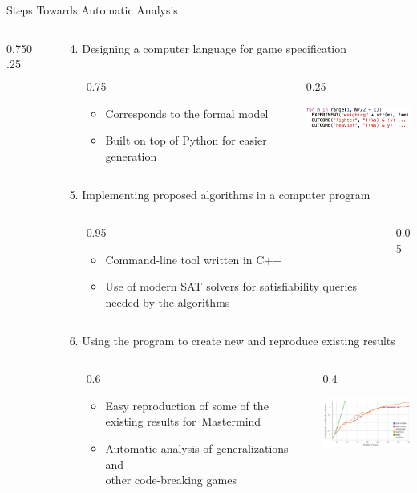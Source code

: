 \documentclass[final]{beamer}
\newcommand{\thando}[4]{
\begin{columns}[T]
\begin{column}{\leftmarginii}
\end{column}
\begin{column}{#3\textwidth}
\vspace{-1.5mm}
\begin{itemize}
#1
\end{itemize}
\end{column}
\begin{column}{#4\textwidth}
#2
\end{column}
\end{columns}\medskip}
\begin{document}
\begin{frame}{}
\begin{block}{Steps Towards Automatic Analysis}
\begin{columns}[T]
\begin{column}{0.48\textwidth}
\begin{enumerate}
{        }{0.75}{0.25}
      \end{enumerate}
      \end{column}
      \begin{column}{0.48\textwidth}
      \begin{enumerate}
      \item[4.] Designing a computer language for game specification
        \thando{
        \item Corresponds to the formal model
        \item Built on top of Python for easier generation
        }{
          \hspace{-17mm}
          \includegraphics[width=4cm]{img-language.png}
        }{0.75}{0.25}
      \item[5.] Implementing proposed algorithms in a computer program
        \thando{
        \item Command-line tool written in C++
        \item Use of modern SAT solvers for satisfiability queries needed by the algorithms
        }{

        }{0.95}{0.05}
      \item[6.] Using the program to create new and reproduce existing results
        \thando{
        \item Easy reproduction of some of the existing results for~Mastermind
        \item Automatic analysis of generalizations and \\other code-breaking games
        }{
          \includegraphics[width=4.5cm]{img-results.png}
        }{0.6}{0.4}
        \end{enumerate}
        \vspace{-3ex}~
      \end{column}
      \end{columns}
    \end{block}       
\vfill
\end{frame}
\end{document}
